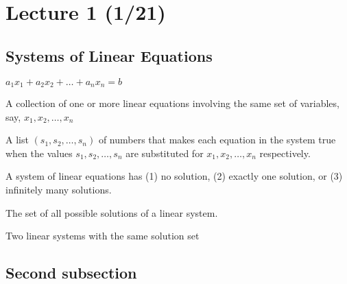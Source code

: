 
\section[Lecture 1 (16 August 2023) -- {\it Linear Equations in Linear Algebra}]{Lecture 1 (1/21)}

\subsection{Systems of Linear Equations}

\begin{definition}
    $a_1 x_1 + a_2 x_2 + \ldots + a_n x_n = b$

\end{definition}

\begin{definition}
    A collection of one or more linear equations involving the same set of variables, say, $x_1, x_2, \ldots, x_n$
    
\end{definition}

\begin{definition}
    A list $\left( s_1, s_2, \ldots, s_n  \right)$ of numbers that makes each equation in the system true when the values $s_1, s_2, \ldots, s_n$ are substituted for $x_1, x_2, \ldots, x_n$ respectively.
\end{definition}

\begin{theorem}
    A system of linear equations has (1) no solution, (2) exactly one solution, or (3) infinitely many solutions.
\end{theorem}

\begin{definition}
    The set of all possible solutions of a linear system.
\end{definition}

\begin{definition}
    Two linear systems with the same solution set
\end{definition}

\subsection{Second subsection}


